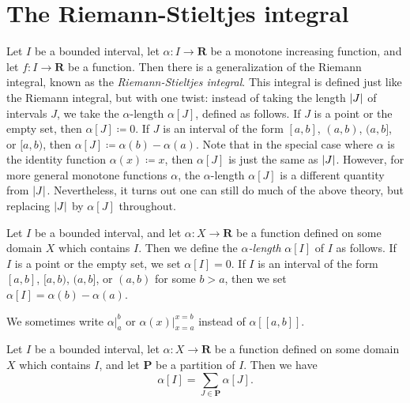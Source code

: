 \section{The Riemann-Stieltjes integral}\label{sec 11.8}

\begin{note}
    Let \(I\) be a bounded interval, let \(\alpha : I \to \mathbf{R}\) be a monotone increasing function, and let \(f : I \to \mathbf{R}\) be a function.
    Then there is a generalization of the Riemann integral, known as the \emph{Riemann-Stieltjes integral}.
    This integral is defined just like the Riemann integral, but with one twist:
    instead of taking the length \(\abs*{J}\) of intervals \(J\), we take the \(\alpha\)-length \(\alpha[J]\), defined as follows.
    If \(J\) is a point or the empty set, then \(\alpha[J] \coloneqq 0\).
    If \(J\) is an interval of the form \([a, b]\), \((a, b)\), \((a, b]\), or \([a, b)\), then \(\alpha[J] \coloneqq \alpha(b) - \alpha(a)\).
    Note that in the special case where \(\alpha\) is the identity function \(\alpha(x) \coloneqq x\), then \(\alpha[J]\) is just the same as \(\abs*{J}\).
    However, for more general monotone functions \(\alpha\), the \(\alpha\)-length \(\alpha[J]\) is a different quantity from \(\abs*{J}\).
    Nevertheless, it turns out one can still do much of the above theory, but replacing \(\abs*{J}\) by \(\alpha[J]\) throughout.
\end{note}

\begin{definition}\label{11.8.1}
    Let \(I\) be a bounded interval, and let \(\alpha : X \to \mathbf{R}\) be a function defined on some domain \(X\) which contains \(I\).
    Then we define the \emph{\(\alpha\)-length} \(\alpha[I]\) of \(I\) as follows.
    If \(I\) is a point or the empty set, we set \(\alpha[I] = 0\).
    If \(I\) is an interval of the form \([a, b]\), \([a, b)\), \((a, b]\), or \((a, b)\) for some \(b > a\), then we set \(\alpha[I] = \alpha(b) - \alpha(a)\).
\end{definition}

\begin{note}
    We sometimes write \(\alpha\big|_a^b\) or \(\alpha(x)\big|_{x = a}^{x = b}\) instead of \(\alpha[[a, b]]\).
\end{note}

\setcounter{theorem}{3}
\begin{lemma}\label{11.8.4}
    Let \(I\) be a bounded interval, let \(\alpha : X \to \mathbf{R}\) be a function defined on some domain \(X\) which contains \(I\), and let \(\mathbf{P}\) be a partition of \(I\).
    Then we have
    \[
        \alpha[I] = \sum_{J \in \mathbf{P}} \alpha[J].
    \]
\end{lemma}

